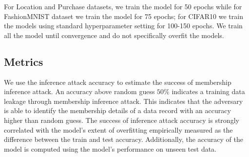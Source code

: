 For Location and Purchase datasets, we train the model for 50 epochs while for FashionMNIST dataset we train the model for 75 epochs; for CIFAR10 we train the models using standard hyperparameter setting for 100-150 epochs.
We train all the model until convergence and do not specifically overfit the models.


\subsection{Metrics}

We use the inference attack accuracy to estimate the success of membership inference attack.
An accuracy above random guess $50\%$ indicates a training data leakage through membership inference attack.
This indicates that the adversary is able to identify the membership details of a data record with an accuracy higher than random guess.
The success of inference attack accuracy is strongly correlated with the model's extent of overfitting empirically measured as the difference between the train and test accuracy.
Additionally, the accuracy of the model is computed using the model's performance on unseen test data.
